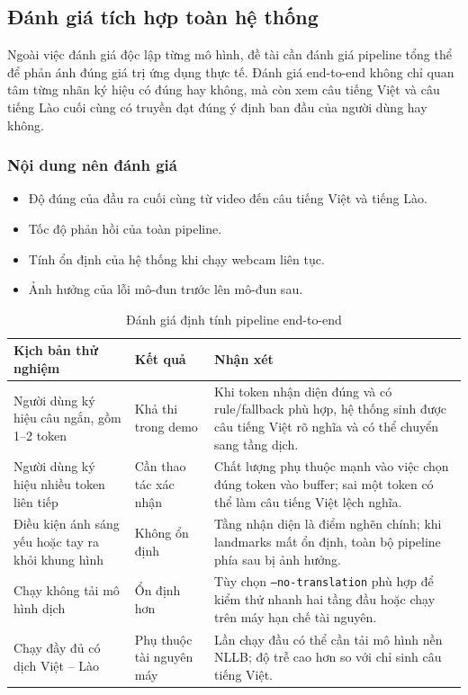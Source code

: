 ﻿\subsection{Đánh giá tích hợp toàn hệ thống}

Ngoài việc đánh giá độc lập từng mô hình, đề tài cần đánh giá pipeline tổng thể để phản ánh đúng giá trị ứng dụng thực tế. Đánh giá end-to-end không chỉ quan tâm từng nhãn ký hiệu có đúng hay không, mà còn xem câu tiếng Việt và câu tiếng Lào cuối cùng có truyền đạt đúng ý định ban đầu của người dùng hay không.

\subsubsection{Nội dung nên đánh giá}
\begin{itemize}
    \item Độ đúng của đầu ra cuối cùng từ video đến câu tiếng Việt và tiếng Lào.
    \item Tốc độ phản hồi của toàn pipeline.
    \item Tính ổn định của hệ thống khi chạy webcam liên tục.
    \item Ảnh hưởng của lỗi mô-đun trước lên mô-đun sau.
\end{itemize}

\begin{table}[H]
\centering
\caption{Đánh giá định tính pipeline end-to-end}
\label{tab:end-to-end-qualitative}
\begin{tabularx}{\textwidth}{|X|p{3.4cm}|X|}
\hline
\textbf{Kịch bản thử nghiệm} & \textbf{Kết quả} & \textbf{Nhận xét} \\
\hline
Người dùng ký hiệu câu ngắn, gồm 1--2 token & Khả thi trong demo & Khi token nhận diện đúng và có rule/fallback phù hợp, hệ thống sinh được câu tiếng Việt rõ nghĩa và có thể chuyển sang tầng dịch. \\
\hline
Người dùng ký hiệu nhiều token liên tiếp & Cần thao tác xác nhận & Chất lượng phụ thuộc mạnh vào việc chọn đúng token vào buffer; sai một token có thể làm câu tiếng Việt lệch nghĩa. \\
\hline
Điều kiện ánh sáng yếu hoặc tay ra khỏi khung hình & Không ổn định & Tầng nhận diện là điểm nghẽn chính; khi landmarks mất ổn định, toàn bộ pipeline phía sau bị ảnh hưởng. \\
\hline
Chạy không tải mô hình dịch & Ổn định hơn & Tùy chọn \texttt{--no-translation} phù hợp để kiểm thử nhanh hai tầng đầu hoặc chạy trên máy hạn chế tài nguyên. \\
\hline
Chạy đầy đủ có dịch Việt -- Lào & Phụ thuộc tài nguyên máy & Lần chạy đầu có thể cần tải mô hình nền NLLB; độ trễ cao hơn so với chỉ sinh câu tiếng Việt. \\
\hline
\end{tabularx}
\end{table}

